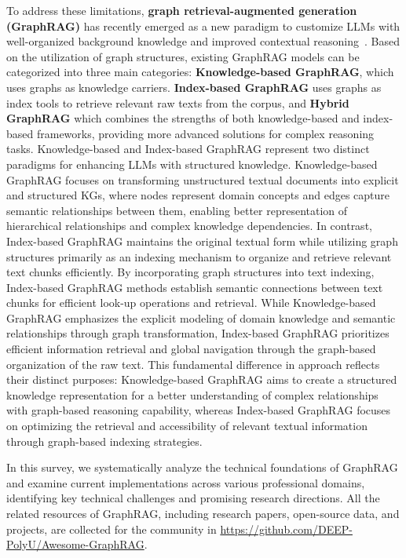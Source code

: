 \documentclass[lettersize,journal]{IEEEtran}
\begin{document}
To address these limitations, \textbf{graph retrieval-augmented generation (GraphRAG)} has recently emerged as a new paradigm to customize LLMs with well-organized background knowledge and improved contextual reasoning~\cite{edge2024local,liang2024kag,peng2024graph,jeon2025hybrid,procko2024graph}. 
Based on the utilization of graph structures, existing GraphRAG models can be categorized into three main categories:  \textbf{Knowledge-based GraphRAG}, which uses graphs as knowledge carriers.  \textbf{Index-based GraphRAG}  uses graphs as index tools to retrieve relevant raw texts from the corpus, and  \textbf{Hybrid GraphRAG} which combines the strengths of both knowledge-based and index-based frameworks, providing more advanced solutions for complex reasoning tasks. 
Knowledge-based and Index-based GraphRAG represent two distinct paradigms for enhancing LLMs with structured knowledge. Knowledge-based GraphRAG focuses on transforming unstructured textual documents into explicit and structured KGs, where nodes represent domain concepts and edges capture semantic relationships between them, enabling better representation of hierarchical relationships and complex knowledge dependencies. In contrast, Index-based GraphRAG maintains the original textual form while utilizing graph structures primarily as an indexing mechanism to organize and retrieve relevant text chunks efficiently. By incorporating graph structures into text indexing, Index-based GraphRAG methods establish semantic connections between text chunks for efficient look-up operations and retrieval. While Knowledge-based GraphRAG emphasizes the explicit modeling of domain knowledge and semantic relationships through graph transformation, Index-based GraphRAG prioritizes efficient information retrieval and global navigation through the graph-based organization of the raw text. This fundamental difference in approach reflects their distinct purposes: Knowledge-based GraphRAG aims to create a structured knowledge representation for a better understanding of complex relationships with graph-based reasoning capability, whereas Index-based GraphRAG focuses on optimizing the retrieval and accessibility of relevant textual information through graph-based indexing strategies. 

In this survey, we systematically analyze the technical foundations of GraphRAG and examine current implementations across various professional domains, identifying key technical challenges and promising research directions. All the related resources of GraphRAG, including research papers, open-source data, and projects, are collected for the community in \textcolor{blue}{\url{https://github.com/DEEP-PolyU/Awesome-GraphRAG}}.
\end{document}
